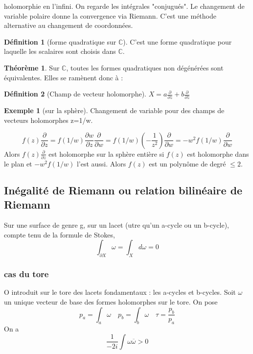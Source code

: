 \documentclass{article}
\newcommand{\C}{\mathbb{C}} %
\theoremstyle{definition} %
\newtheorem{defi}{Définition}
\newtheorem{thm}{Théorème}
\newtheorem{ex}{Exemple}
\newcommand{\derp}[2]{\frac{\partial {#1}}{\partial {#2}}}
\newcommand{\1}{\mathbb{1}} %
\begin{document}
holomorphie en l'infini.
On regarde les intégrales "conjugués".
Le changement de variable polaire donne la convergence via Riemann.
C'est une méthode alternative au changement de coordonnées.



\begin{defi}[forme quadratique sur $\C$]
C'est une forme quadratique pour laquelle les scalaires sont choisis dans $\C$.
\end{defi}

\begin{thm}
Sur $\C$, toutes les formes quadratiques non dégénérées sont équivalentes.
Elles se ramènent donc à :
\end{thm}


\begin{defi}[Champ de vecteur holomorphe]
$X= a \derp{}{z} + b \derp{}{\overline{z}}$
\end{defi}

\begin{ex}[sur la sphère]
Changement de variable pour des champs de vecteurs holomorphes z=1/w.

$$f(z)\frac{\partial}{\partial z}=f(1/w)\frac{\partial w}{\partial z}\frac{\partial}{\partial w}=f(1/w)\left(-\frac{1}{z^2}\right)\frac{\partial}{\partial w}=-w^2f(1/w)\frac{\partial}{\partial w}
$$
Alors $f(z)\frac{\partial}{\partial z}$ est holomorphe sur la sphère entière si $f(z)$ est holomorphe dans le plan et $-w^2f(1/w)$ l'est aussi. Alors $f(z)$ est un polynôme de degré $\leqslant 2$.

\end{ex}

\subsection{Inégalité de Riemann ou relation bilinéaire de Riemann}

Sur une surface de genre g, sur un lacet (utre qu'un a-cycle ou un b-cycle), compte tenu de la formule de Stokes,
$$\int_{\partial X} \omega = \int_X d \omega = 0$$

\subsubsection{cas du tore}

O introduit sur le tore des lacets fondamentaux : les a-cycles et b-cycles.
Soit $\omega$ un unique vecteur de base des formes holomorphes sur le tore.
On pose 
$$p_a= \int_a \omega \quad  p_b =\int_b \omega  \quad \tau=\frac{p_b}{p_a}$$
On a
$$\frac{1}{-2i} \int \omega \overline{\omega} > 0$$
\end{document}

